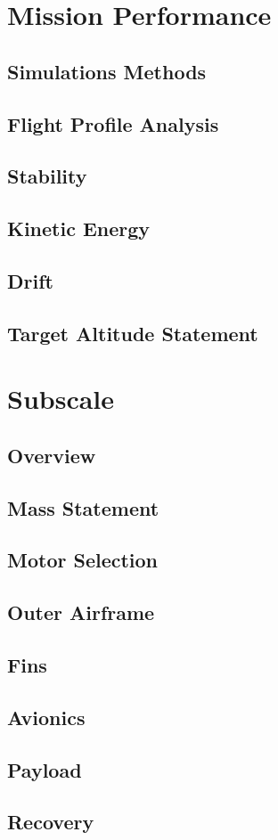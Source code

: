 \section{Mission Performance}

    \subsection{Simulations Methods}
    
    \subsection{Flight Profile Analysis}
    
    \subsection{Stability}
    
    \subsection{Kinetic Energy}
    
    \subsection{Drift}
    
    \subsection{Target Altitude Statement}

\section{Subscale}

    \subsection{Overview}
    
    \subsection{Mass Statement}
    
    \subsection{Motor Selection}
    
    \subsection{Outer Airframe}
    
    \subsection{Fins}
    
    \subsection{Avionics}
    
    \subsection{Payload}
    
    \subsection{Recovery}
